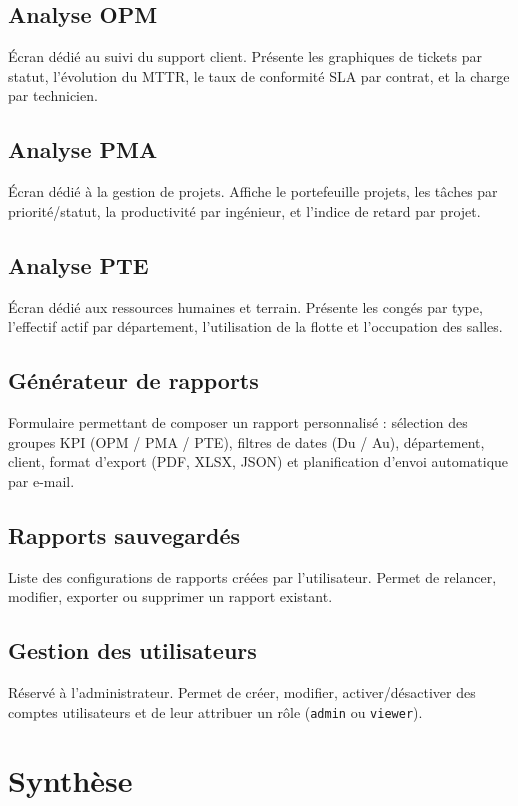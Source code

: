 \documentclass[a4paper,12pt]{article}
\begin{document}
\subsection{Analyse OPM}
Écran dédié au suivi du support client. Présente les graphiques de tickets par statut,
l'évolution du MTTR, le taux de conformité SLA par contrat, et la charge par technicien.

\subsection{Analyse PMA}
Écran dédié à la gestion de projets. Affiche le portefeuille projets, les tâches par
priorité/statut, la productivité par ingénieur, et l'indice de retard par projet.

\subsection{Analyse PTE}
Écran dédié aux ressources humaines et terrain. Présente les congés par type,
l'effectif actif par département, l'utilisation de la flotte et l'occupation des salles.

\subsection{Générateur de rapports}
Formulaire permettant de composer un rapport personnalisé : sélection des groupes KPI
(OPM / PMA / PTE), filtres de dates (Du / Au), département, client, format d'export
(PDF, XLSX, JSON) et planification d'envoi automatique par e-mail.

\subsection{Rapports sauvegardés}
Liste des configurations de rapports créées par l'utilisateur. Permet de relancer,
modifier, exporter ou supprimer un rapport existant.

\subsection{Gestion des utilisateurs}
Réservé à l'administrateur. Permet de créer, modifier, activer/désactiver des comptes
utilisateurs et de leur attribuer un rôle (\texttt{admin} ou \texttt{viewer}).

\section{Synthèse}
\end{document}
